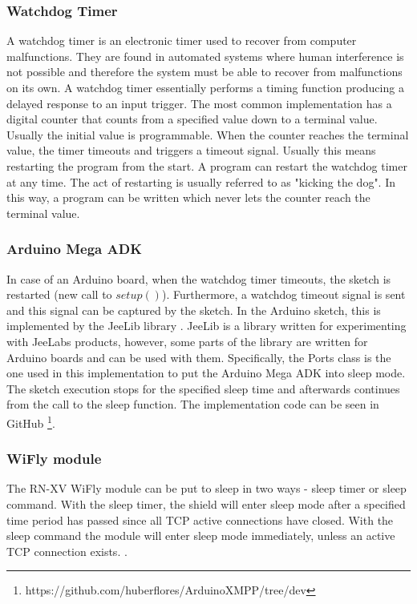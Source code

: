 \subsubsection{Watchdog Timer}
A watchdog timer \cite{watchdog_timer} is an electronic timer used to recover from computer malfunctions. They are found in automated systems where human interference is not possible and therefore the system must be able to recover from malfunctions on its own. 
A watchdog timer essentially performs a timing function producing a delayed response to an input trigger. The most common implementation has a digital counter that counts from a specified value down to a terminal value. Usually the initial value is programmable. When the counter reaches the terminal value, the timer timeouts and triggers a timeout signal. Usually this means restarting the program from the start. A program can restart the watchdog timer at any time. The act of restarting is usually referred to as "kicking the dog". In this way, a program can be written which never lets the counter reach the terminal value.

\subsubsection{Arduino Mega ADK}

In case of an Arduino board, when the watchdog timer timeouts, the sketch is restarted (new call to $setup()$). Furthermore, a watchdog timeout signal is sent and this signal can be captured by the sketch. In the Arduino sketch, this is implemented by the JeeLib library \cite{jeelib_general}. JeeLib is a library written for experimenting with JeeLabs products, however, some parts of the library are written for Arduino boards and can be used with them. Specifically, the Ports class \cite{jeelib_port} is the one used in this implementation to put the Arduino Mega ADK into sleep mode. The sketch execution stops for the specified sleep time and afterwards continues from the call to the sleep function. The implementation code can be seen in GitHub \footnote{https://github.com/huberflores/ArduinoXMPP/tree/dev}.

\subsubsection{WiFly module}

The RN-XV WiFly module can be put to sleep in two ways - sleep timer or sleep command. With the sleep timer, the shield will enter sleep mode after a specified time period has passed since all TCP active connections have closed. With the sleep command the module will enter sleep mode immediately, unless an active TCP connection exists. \cite{wifly_manual}. 

